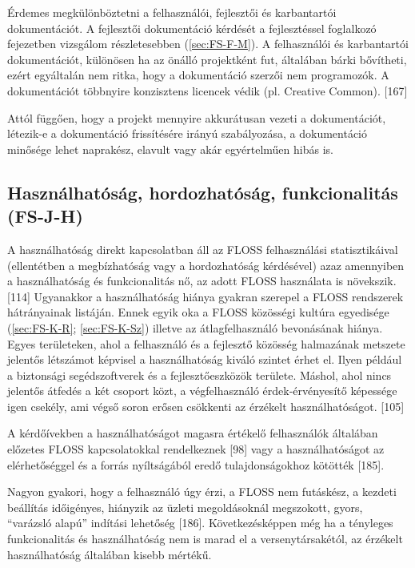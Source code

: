 \documentclass[12pt,magyar,a4paper,oneside]{scrreprt}
\begin{document}
Érdemes megkülönböztetni a felhasználói, fejlesztői és karbantartói
dokumentációt. A fejlesztői dokumentáció kérdését a fejlesztéssel
foglalkozó fejezetben vizsgálom részletesebben (\ref{sec:FS-F-M}). A
felhasználói és karbantartói dokumentációt, különösen ha az önálló
projektként fut, általában bárki bővítheti, ezért egyáltalán nem ritka,
hogy a dokumentáció szerzői nem programozók. A dokumentációt többnyire
konzisztens licencek védik (pl. Creative Common). {[}167{]}

Attól függően, hogy a projekt mennyire akkurátusan vezeti a
dokumentációt, létezik-e a dokumentáció frissítésére irányú
szabályozása, a dokumentáció minősége lehet naprakész, elavult vagy akár
egyértelműen hibás is.

\hypertarget{sec:FS-J-H}{%
\subsection{Használhatóság, hordozhatóság, funkcionalitás
(FS-J-H)}\label{sec:FS-J-H}}

A használhatóság direkt kapcsolatban áll az FLOSS felhasználási
statisztikáival (ellentétben a megbízhatóság vagy a hordozhatóság
kérdésével) azaz amennyiben a használhatóság és funkcionalitás nő, az
adott FLOSS használata is növekszik. {[}114{]} Ugyanakkor a
használhatóság hiánya gyakran szerepel a FLOSS rendszerek hátrányainak
listáján. Ennek egyik oka a FLOSS közösségi kultúra egyedisége
(\ref{sec:FS-K-R}; \ref{sec:FS-K-Sz}) illetve az átlagfelhasználó
bevonásának hiánya. Egyes területeken, ahol a felhasználó és a fejlesztő
közösség halmazának metszete jelentős létszámot képvisel a
használhatóság kiváló szintet érhet el. Ilyen például a biztonsági
segédszoftverek és a fejlesztőeszközök területe. Máshol, ahol nincs
jelentős átfedés a két csoport közt, a végfelhasználó érdek-érvényesítő
képessége igen csekély, ami végső soron erősen csökkenti az érzékelt
használhatóságot. {[}105{]}

A kérdőívekben a használhatóságot magasra értékelő felhasználók
általában előzetes FLOSS kapcsolatokkal rendelkeznek {[}98{]} vagy a
használhatóságot az elérhetőséggel és a forrás nyíltságából eredő
tulajdonságokhoz kötötték {[}185{]}.

Nagyon gyakori, hogy a felhasználó úgy érzi, a FLOSS nem futáskész, a
kezdeti beállítás időigényes, hiányzik az üzleti megoldásoknál
megszokott, gyors, ``varázsló alapú'' indítási lehetőség {[}186{]}.
Következésképpen még ha a tényleges funkcionalitás és használhatóság nem
is marad el a versenytársakétól, az érzékelt használhatóság általában
kisebb mértékű.
\end{document}
